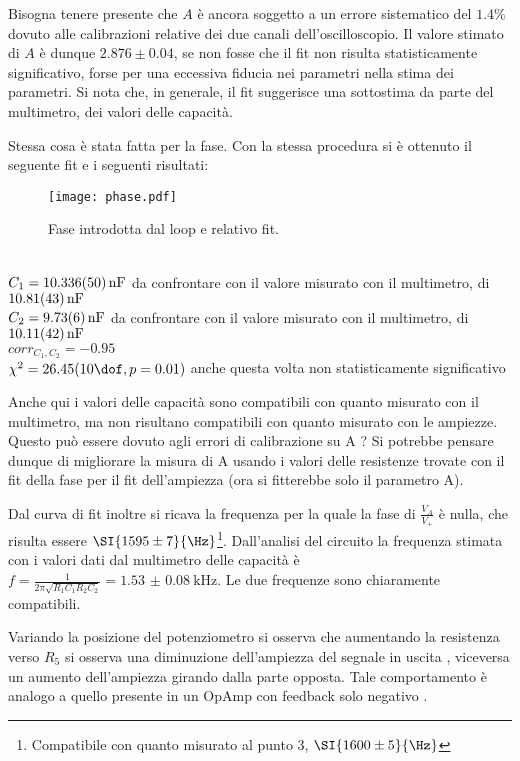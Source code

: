Bisogna tenere presente che $A$ è ancora soggetto a un errore sistematico del $1.4 \%$ dovuto alle calibrazioni relative dei due canali dell'oscilloscopio. Il valore stimato di $A$ è dunque $2.876 \pm 0.04$, se non fosse che il fit non risulta statisticamente significativo, forse per una eccessiva fiducia nei parametri nella stima dei parametri.
Si nota che, in generale, il fit suggerisce una sottostima da parte del multimetro, dei  valori delle capacità.


Stessa cosa è stata fatta per la fase. Con la stessa procedura si è ottenuto il seguente fit e i seguenti risultati:
\begin{figure}[h]
	\centering
	\texttt{[image: phase.pdf]}
	\caption{Fase introdotta dal loop e relativo fit.}
	\label{f:lpfs}
\end{figure}
\\
$C_1=\SI{10.336 \pm 0.05}{nF}$ da confrontare con il valore misurato con il multimetro, di $\SI{10.81\pm 0.43}{nF}$\\
$C_2=\SI{9.73\pm 0.06}{nF}$ da confrontare con il valore misurato con il multimetro, di $\SI{10.11\pm 0.42}{nF}$\\
$corr_{C_1, C_2}=-0.95$\\
$\chi^2=26.45 (10 \dof, p = 0.01)$ anche questa volta non statisticamente significativo


Anche qui i valori delle capacità sono compatibili con quanto misurato con il multimetro, ma non risultano compatibili con quanto misurato con le ampiezze. Questo può essere dovuto agli errori di calibrazione su A ? Si potrebbe pensare dunque di migliorare la misura di A usando i valori delle resistenze trovate con il fit della fase per il fit dell'ampiezza (ora si fitterebbe solo il parametro A). %


Dal curva di fit inoltre si ricava la frequenza per la quale la fase di $\frac{V_A}{V_+}$ è nulla, che risulta essere $\SI{1595 \pm 7}{\Hz}$\footnote{Compatibile con quanto misurato al punto 3, $\SI{1600 \pm 5}{\Hz}$}.%
Dall'analisi del circuito la frequenza stimata con i valori dati dal multimetro delle capacità è $f=\frac{1}{2 \pi \sqrt{R_1C_1R_2C_2}}= \SI{1.53(8)}{\kHz}$. Le due frequenze sono chiaramente compatibili.


Variando la posizione del potenziometro si osserva che aumentando la resistenza verso $R_5$ si osserva una diminuzione dell'ampiezza del segnale in uscita , viceversa un aumento dell'ampiezza girando dalla parte opposta. Tale comportamento è analogo a quello presente in un OpAmp con feedback solo negativo .
